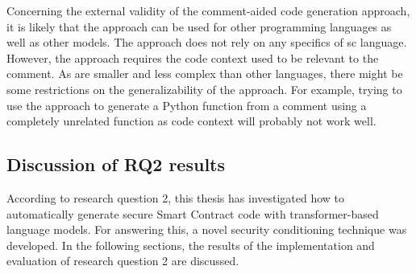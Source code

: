 Concerning the external validity of the comment-aided code generation approach, it is likely that the approach can be used for other programming languages as well as other models. The approach does not rely on any specifics of \acrshort{sc} language. However, the approach requires the code context used to be relevant to the comment. As  are smaller and less complex than other languages, there might be some restrictions on the generalizability of the approach. For example, trying to use the approach to generate a Python function from a comment using a completely unrelated function as code context will probably not work well.




%
%
%
%
%
%
%
%

\subsection{Discussion of RQ2 results}
\label{sec:rq2-discussion-results}
According to research question 2, this thesis has investigated how to automatically generate secure Smart Contract code with transformer-based language models. For answering this, a novel security conditioning technique was developed. In the following sections, the results of the implementation and evaluation of research question 2 are discussed.

